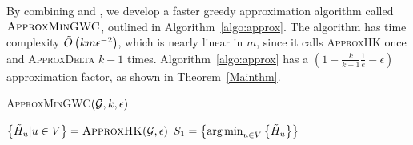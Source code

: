 \documentclass[10pt,twocolumn,twoside]{IEEEtran}
\begin{document}
By combining  and , we develop a faster greedy approximation algorithm called \(\textsc{ApproxMinGWC}\), outlined in Algorithm~\ref{algo:approx}. The algorithm has time  complexity \(\tilde{O}\left( km\epsilon^{-2} \right)\), which  is nearly linear in $m$,  since it calls \textsc{ApproxHK} once and \textsc{ApproxDelta} \(k-1\) times. Algorithm~\ref{algo:approx} has a $(1-\frac{k}{k-1}\frac{1}{e}-\epsilon)$ approximation factor, as shown in Theorem~\ref{Mainthm}.

\begin{algorithm}
    \caption{\textsc{ApproxMinGWC}\((\mathcal{G},k,\epsilon)\)}
    \label{algo:approx}
    \(\left\{\tilde{H}_u|u\in V  \right\}=\textsc{ApproxHK}(\mathcal{G},\epsilon)\)\;
    \(S_1=\left\{\operatorname*{arg\,min}_{u\in V}\left\{\tilde{H}_u \right\} \right\}\)\;
\end{algorithm}
\end{document}
